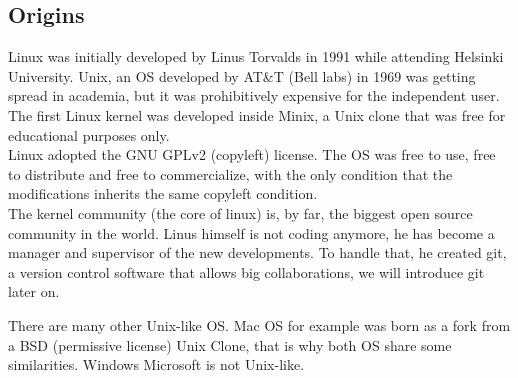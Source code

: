 \documentclass[a4paper]{article}
\begin{document}
\subsection{Origins}
Linux was initially developed by Linus Torvalds in 1991 while attending Helsinki University. Unix, an OS developed by AT\&T (Bell labs) in 1969 was getting spread in academia, but it was prohibitively expensive for the independent user. The first Linux kernel was developed inside Minix, a Unix clone that was free for educational purposes only.\\
Linux adopted the GNU GPLv2 (copyleft) license. The OS was free to use, free to distribute and free to commercialize, with the only condition that the modifications inherits the same copyleft condition.\\
The kernel community (the core of linux) is, by far, the biggest open source community in the world. Linus himself is not coding anymore, he has become a manager and supervisor of the new developments. To handle that, he created git, a version control software that allows big collaborations, we will introduce git later on.

There are many other Unix-like OS. Mac OS for example was born as a fork from a BSD (permissive license) Unix Clone, that is why both OS share some similarities. Windows Microsoft is not Unix-like.
\end{document}
